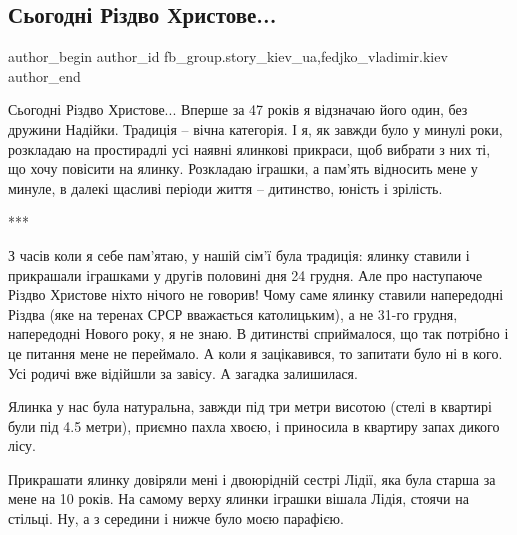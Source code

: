  
 
 
 
 
 
\subsection{Сьогодні Різдво Христове...}
\label{sec:25_12_2021.fb.fb_group.story_kiev_ua.1.rizdvo}
 
\ifcmt
 author_begin
   author_id fb_group.story_kiev_ua,fedjko_vladimir.kiev
 author_end
\fi

Сьогодні Різдво Христове... Вперше за 47 років я відзначаю його один, без дружини
Надійки. Традиція – вічна категорія. І я, як завжди було у минулі роки,
розкладаю на простирадлі усі наявні ялинкові прикраси, щоб вибрати з них ті, що
хочу повісити на ялинку. Розкладаю іграшки, а пам’ять відносить мене у минуле,
в далекі щасливі періоди життя – дитинство, юність і зрілість.

***

З часів коли я себе пам'ятаю, у нашій сім'ї була традиція: ялинку ставили і
прикрашали іграшками у другів половині дня 24 грудня. Але про наступаюче Різдво
Христове ніхто нічого не говорив! Чому саме ялинку ставили напередодні Різдва
(яке на теренах СРСР вважається католицьким), а не 31-го грудня, напередодні
Нового року, я не знаю. В дитинстві сприймалося, що так потрібно і це питання
мене не переймало. А коли я зацікавився, то запитати було ні в кого. Усі родичі
вже відійшли за завісу. А загадка залишилася. 

Ялинка у нас була натуральна, завжди під три метри висотою (стелі в квартирі
були під 4.5 метри), приємно пахла хвоєю, і приносила в квартиру запах дикого
лісу. 

Прикрашати ялинку довіряли мені і двоюрідній сестрі Лідії, яка була старша за
мене на 10 років. На самому верху ялинки іграшки вішала Лідія, стоячи на
стільці. Ну, а з середини і нижче було моєю парафією.

